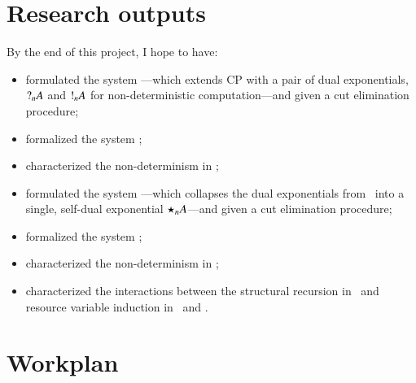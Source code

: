 \documentclass[twocolumn]{article}
\begin{document}
\section{Research outputs}
By the end of this project, I hope to have:
\begin{itemize}
\item%
  formulated the system \gtcp---which extends CP with a pair of dual
  exponentials, $\give[n]{A}$ and $\take[n]{A}$ for non-deterministic
  computation---and given a cut elimination procedure;
\item%
  formalized the system \gtcp;
\item%
  characterized the non-determinism in \gtcp;
\item%
  formulated the system \ndcp---which collapses the dual exponentials
  from \gtcp\ into a single, self-dual exponential $\nod[n]{A}$---and given a
  cut elimination procedure;
\item%
  formalized the system \ndcp;
\item%
  characterized the non-determinism in \ndcp;
\item%
  characterized the interactions between the structural recursion in \mucp\ and
  resource variable induction in \gtcp\ and \ndcp.
\end{itemize}

\section{Workplan}



\end{document}

